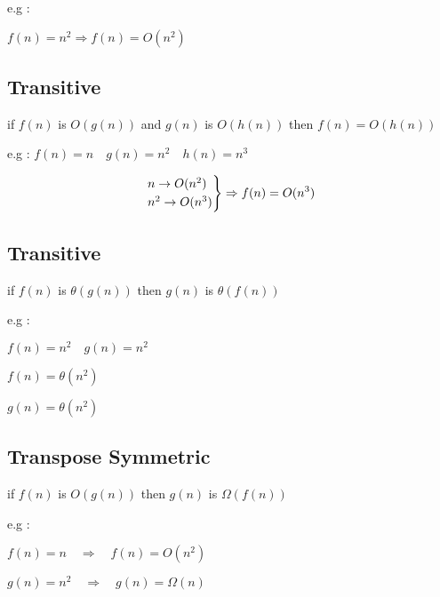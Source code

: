 \documentclass[12pt]{article}
\begin{document}
e.g : 

$f(n) = n^{2} \Rightarrow f(n) = O(n^{2})$



\subsection{Transitive}

\begin{tcolorbox}
if
$f(n)$
is 
$O(g(n))$
and
$g(n)$
is 
$O(h(n))$
then
$f(n) = O(h(n))$
\end{tcolorbox}


e.g : $f(n) = n \quad g(n) = n^{2} \quad h(n) = n^{3}$


\begin{align*}
\begin{rcases}
n \to O(n^{2}) \\
n^{2} \to  O(n^{3}) \\
\end{rcases}
\Rightarrow f(n) = O(n^{3})
\end{align*}




\subsection{Transitive}

\begin{tcolorbox}
if
$f(n)$
is 
$\theta(g(n))$
then
$g(n)$
is 
$\theta(f(n))$
\end{tcolorbox}



e.g : 

$f(n) = n^{2} \quad g(n) = n^{2}$

$f(n) = \theta(n^{2})$

$g(n) = \theta(n^{2})$





\subsection{Transpose Symmetric}

\begin{tcolorbox}
if
$f(n)$
is 
$O(g(n))$
then
$g(n)$
is 
$\Omega(f(n))$
\end{tcolorbox}


e.g : 


$f(n) = n \quad  \Rightarrow \quad f(n) = O(n^{2})$

$g(n) = n^{2} \quad \Rightarrow \quad g(n) = \Omega(n)$
\end{document}

